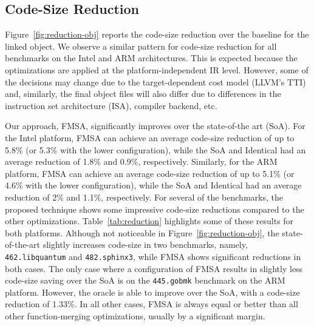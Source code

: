 \subsection{Code-Size Reduction}



Figure~\ref{fig:reduction-obj} reports the code-size reduction over the baseline for the linked object. %
We observe a similar pattern for code-size reduction for all benchmarks on the Intel and ARM architectures. This is expected because the
optimizations are applied at the platform-independent IR level. However, some of the decisions may change due to the target-dependent cost
model (LLVM's TTI) and, similarly, the final object files will also differ due to differences in the instruction set architecture (ISA),
compiler backend, etc.

Our approach, FMSA, significantly improves over the state-of-the art (SoA). For the Intel platform, FMSA can achieve an average code-size
reduction of up to 5.8\% (or 5.3\% with the lower configuration), while the SoA and Identical had an average reduction of 1.8\% and 0.9\%,
respectively. Similarly, for the ARM platform, FMSA can achieve an average code-size reduction of up to 5.1\% (or 4.6\% with the lower
configuration), while the SoA and Identical had an average reduction of 2\% and 1.1\%, respectively. For several of the benchmarks, the
proposed technique shows some impressive code-size reductions compared to the other optimizations. Table~\ref{tab:reduction} highlights
some of these results for both platforms. Although not noticeable in Figure~\ref{fig:reduction-obj}, the state-of-the-art slightly
increases code-size in two benchmarks, namely, \texttt{462.libquantum} and \texttt{482.sphinx3}, while FMSA shows significant reductions in
both cases. The only case where a configuration of FMSA results in slightly less code-size saving over the SoA is on the \texttt{445.gobmk}
benchmark on the ARM platform. However, the oracle is able to improve over the SoA, with a code-size reduction of 1.33\%. In all other
cases, FMSA is always equal or better than all other function-merging optimizations, usually by a significant margin.

